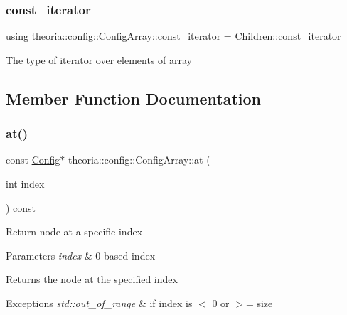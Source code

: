 \subsubsection{\texorpdfstring{const\+\_\+iterator}{const\_iterator}}
{\footnotesize\ttfamily using \hyperlink{classtheoria_1_1config_1_1ConfigArray_ace80948768681e7eb033825f4fe761f2}{theoria\+::config\+::\+Config\+Array\+::const\+\_\+iterator} =  Children\+::const\+\_\+iterator}

The type of iterator over elements of array 

\subsection{Member Function Documentation}
\mbox{\label{classtheoria_1_1config_1_1ConfigArray_a7200bc93265f3b9d9b5ea462fca4a0cb}} 
\subsubsection{\texorpdfstring{at()}{at()}}
{\footnotesize\ttfamily const \hyperlink{classtheoria_1_1config_1_1Config}{Config}$\ast$ theoria\+::config\+::\+Config\+Array\+::at (\begin{DoxyParamCaption}\item[{int}]{index }\end{DoxyParamCaption}) const\hspace{0.3cm}{\ttfamily [inline]}}

Return node at a specific index 
\begin{DoxyParams}{Parameters}
{\em index} & 0 based index \\
\hline
\end{DoxyParams}
\begin{DoxyReturn}{Returns}
the node at the specified index 
\end{DoxyReturn}

\begin{DoxyExceptions}{Exceptions}
{\em std\+::out\+\_\+of\+\_\+range} & if index is $<$ 0 or $>$= size \\
\hline
\end{DoxyExceptions}
\mbox{\label{classtheoria_1_1config_1_1ConfigArray_a21faee00f3613c6c36a044c7a37de609}} 
